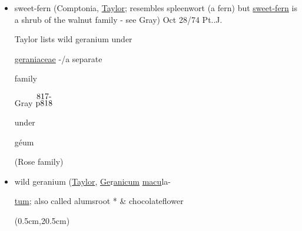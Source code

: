 \documentclass[a4paper,10pt]{article}
\begin{document}
\begin{flushleft}
\begin{itemize}
\par 
Chrysanthemum Balsomita Garden Ency Taylor)
\begin{adjustwidth}{-0.5in}{-0.5in}
    \rule{4.5in}{0.005in}  
\end{adjustwidth}
\begin{flushright}
$\downarrow$(identified as follow at {$\stackrel{\hbox{Suffolk}}{\hbox{Rose Soc.}}$})
\end{flushright}
\item sweet-fern (Comptonia, \ul{Taylor}; resembles spleenwort (a fern) but \ul{sweet-fern} is a shrub of the walnut family - see Gray)
Oct 28/74 Pt..J.\par
\color{red}
\footnotesize
\begin{minipage}{2in} 
    Taylor lists wild geranium under\par
    \ul{geraniaceae} -/a separate\par
    family
\end{minipage}%
\hfill
\begin{minipage}{0.6in}
    Gray $\stackrel{\hbox{817-}}{\hbox{p818}}$ 
\end{minipage}%
\begin{minipage}{0.7in}
    under\par
    g\'eum\par
    (Rose family)
\end{minipage}%
\color{blue}
\normalsize
\item wild geranium (\ul{Taylor}, \ul{Ge}r\ul{anicum} \ul{macu}la-\par
\ul{tum}; also called alumsroot
\color{red}
* 
\color{blue}
\& chocolateflower\par
{}
\color{red}
\begin{textblock*}{3.22in}(0.5cm,20.5cm)%

\end{textblock*}
\end{itemize}
\end{flushleft}
\end{document}
